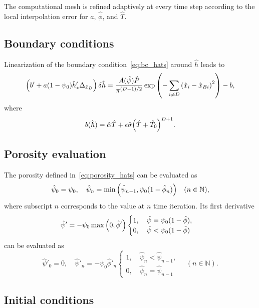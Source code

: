 \documentclass{article}
\newcommand{\dder}[2][]{\Delta_{#2}#1}
\newcommand{\Hx}{\hat{x}}
\newcommand{\Hh}{\hat{h}}
\newcommand{\HT}{\hat{T}}
\newcommand{\HP}{\hat{P}}
\newcommand{\Halpha}{\hat{\alpha}}
\newcommand{\Hsigma}{\hat{\sigma}}
\newcommand{\Hphi}{\hat{\phi}}
\newcommand{\Hpsi}{\hat{\psi}}
\begin{document}
The computational mesh is refined adaptively at every time step
according to the local interpolation error for \(a\), \(\Hphi\), and \(\HT\).

\subsection{Boundary conditions}

Linearization of the boundary condition~\eqref{eq:bc_hats} around \(\Hh\) leads to
\begin{equation}\label{eq:bc_linearized}
    \qty(b' + a\qty(1 - \psi_0) \Hh'_* \dder{\Hx_D})\var{\Hh} =
	    \frac{A(\Hpsi)\HP}{\pi^{(D-1)/2}}\exp\qty( -\sum_{i\neq D}\qty(\Hx_i-\Hx_{Bi})^2 ) - b,
\end{equation}
where
\begin{equation}\label{eq:bc_Dirichlet_part}
    b(\Hh) = \Halpha\HT + \epsilon\Hsigma\qty(\HT + \HT_0)^{D+1}.
\end{equation}

\subsection{Porosity evaluation}

The porosity defined in~\eqref{eq:porosity_hats} can be evaluated as
\begin{equation}\label{eq:porosity_eval}
    \Hpsi_0 = \psi_0, \quad \Hpsi_n = \min\qty(\Hpsi_{n-1}, \psi_0(1-\Hphi_n)) \quad (n\in\mathbb{N}),
\end{equation}
where subscript \(n\) corresponds to the value at \(n\) time iteration.
Its first derivative
\begin{equation}\label{eq:Dporosity}
    \Hpsi' = -\psi_0\max\qty(0, \Hphi') \begin{cases}
        1, \quad \Hpsi = \psi_0(1-\Hphi), \\
        0, \quad \Hpsi < \psi_0(1-\Hphi)
    \end{cases}
\end{equation}
can be evaluated as
\begin{equation}\label{eq:Dporosity_eval}
    \Hpsi'_0 = 0, \quad \Hpsi'_n = -\psi_0\Hphi'_n \begin{cases}
        1, \quad \Hpsi_n < \Hpsi_{n-1}, \\
        0, \quad \Hpsi_n = \Hpsi_{n-1}
    \end{cases}\quad (n\in\mathbb{N}).
\end{equation}

\subsection{Initial conditions}
\end{document}
